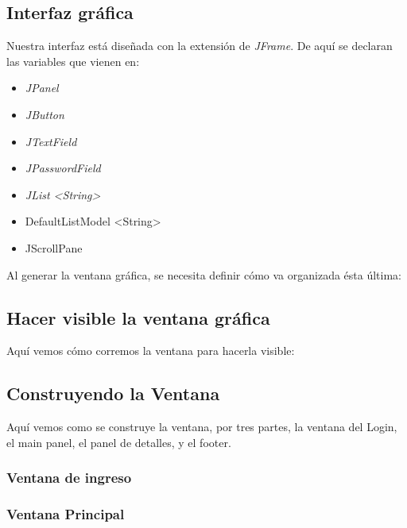 \documentclass[12pt]{article}
\begin{document}
\subsection{Interfaz gr\'afica}
{Nuestra interfaz est\'a dise\~nada con la extensi\'on de \textit{JFrame}. De aqu\'i se declaran las variables que vienen en:}
\begin{itemize}
\item \textit{JPanel}
\item \textit{JButton}
\item \textit{JTextField}
\item \textit{JPasswordField}
\item \textit{JList \textless{String}\textgreater}
\item DefaultListModel \textless{String}\textgreater
\item JScrollPane
\end{itemize}

{Al generar la ventana gr\'afica, se necesita definir c\'omo va organizada \'esta \'ultima:}\\



\subsection{Hacer visible la ventana gr\'afica}
{Aqu\'i vemos c\'omo corremos la ventana para hacerla visible:}




\subsection{Construyendo la Ventana}
{Aqu\'i vemos como se construye la ventana, por tres partes, la ventana del Login, el main panel, el panel de detalles, y el footer.}
\subsubsection{Ventana de ingreso}



\subsubsection{Ventana Principal}

\end{document}
